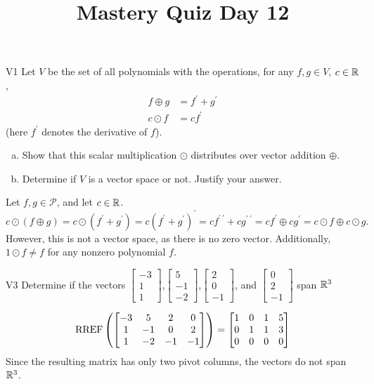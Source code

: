 \documentclass{sbgLAquiz}
\title{Mastery Quiz Day 12 }
\begin{document}
\begin{problem}{V1}
Let $V$ be the set of all polynomials with the operations, for any $f, g \in V$, $c \in \mathbb{R}$,
\begin{align*}
f \oplus g &= f^\prime + g^\prime \\
c \odot f &= c f^\prime
\end{align*}
(here $f^\prime$ denotes the derivative of $f$).
\begin{enumerate}[(a)]
\item Show that this scalar multiplication $\odot$ distributes over vector addition $\oplus$.
\item Determine if $V$ is a vector space or not.  Justify your answer.
\end{enumerate}
\end{problem}
\begin{solution}
Let $f,g \in \mathcal{P}$, and let $c \in \mathbb{R}$.
$$c \odot (f \oplus g) = c \odot (f^\prime+g^\prime) =
c(f^\prime+g^\prime)^\prime = cf^{\prime\ \prime}+cg^{\prime\ \prime} =
cf^\prime\oplus cg^\prime= c \odot f \oplus c \odot g.$$
However, this is not a vector space, as there is no zero vector.  Additionally, $1 \odot f \neq f$ for any nonzero polynomial $f$.
\end{solution}


\begin{problem}{V3}
Determine if the vectors  $\begin{bmatrix} -3 \\ 1 \\ 1 \end{bmatrix}$,$\begin{bmatrix} 5 \\ -1 \\ -2 \end{bmatrix}$,$\begin{bmatrix}2 \\ 0 \\ -1 \end{bmatrix}$, and $\begin{bmatrix} 0 \\ 2 \\ -1\end{bmatrix}$ span $\mathbb{R}^3$
\end{problem}
\begin{solution}
$$\operatorname{RREF}\left(\begin{bmatrix}
-3 & 5 & 2 & 0 \\ 1 & -1 & 0 & 2 \\ 1 & -2 & -1 & -1 \end{bmatrix}\right)=\begin{bmatrix} 1 & 0 & 1 & 5 \\ 0 & 1 & 1 & 3 \\ 0 & 0 & 0 & 0\end{bmatrix}$$
Since the resulting matrix has only two pivot columns, the vectors do not span $\mathbb{R}^3$.
\end{solution}
\end{document}
